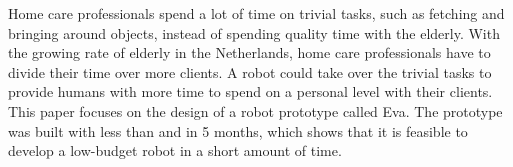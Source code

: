\documentclass[project_eva.tex]{subfiles}
\begin{document}
Home care professionals spend a lot of time on trivial tasks, such as fetching and bringing around objects, instead of spending quality time with the elderly. With the growing rate of elderly in the Netherlands\cite{CBS}, home care professionals have to divide their time over more clients. A robot could take over the trivial tasks to provide humans with more time to spend on a personal level with their clients. This paper focuses on the design of a robot prototype called Eva. The prototype was built with less than  and in 5 months, which shows that it is feasible to develop a low-budget robot in a short amount of time.
\end{document}
